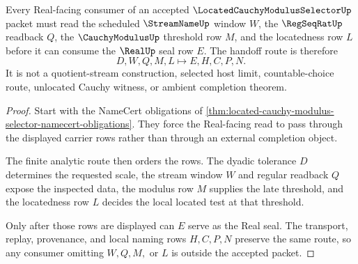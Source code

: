 \begin{theorem}
\label{thm:located-cauchy-modulus-selector-real-seal-handoff}
Every Real-facing consumer of an accepted $\LocatedCauchyModulusSelectorUp$ packet must read the scheduled $\StreamNameUp$ window $W$, the $\RegSeqRatUp$ readback $Q$, the $\CauchyModulusUp$ threshold row $M$, and the locatedness row $L$ before it can consume the $\RealUp$ seal row $E$. The handoff route is therefore
$$
D,W,Q,M,L \longmapsto E,H,C,P,N .
$$
It is not a quotient-stream construction, selected host limit, countable-choice route, unlocated Cauchy witness, or ambient completion theorem.
\end{theorem}
\begin{proof}
Start with the NameCert obligations of \autoref{thm:located-cauchy-modulus-selector-namecert-obligations}. They force the Real-facing read to pass through the displayed carrier rows rather than through an external completion object.

The finite analytic route then orders the rows. The dyadic tolerance $D$ determines the requested scale, the stream window $W$ and regular readback $Q$ expose the inspected data, the modulus row $M$ supplies the late threshold, and the locatedness row $L$ decides the local located test at that threshold.

Only after those rows are displayed can $E$ serve as the Real seal. The transport, replay, provenance, and local naming rows $H,C,P,N$ preserve the same route, so any consumer omitting $W,Q,M,$ or $L$ is outside the accepted packet.
\end{proof}

